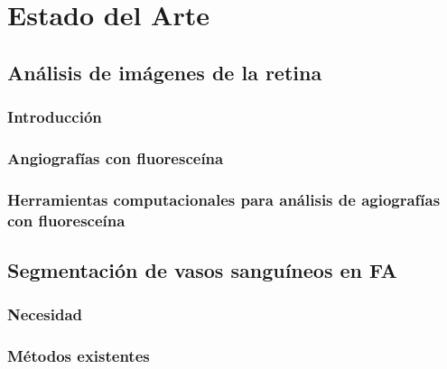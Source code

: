 
\chapter{Estado del Arte} %

\label{Chapter2} %


\section{An\'alisis  de im\'agenes de la retina}

	\subsection{Introducci\'on}

	\subsection{Angiograf\'ias con fluoresce\'ina}

	\subsection{Herramientas computacionales para an\'alisis de agiograf\'ias con fluoresce\'ina}

\section{Segmentaci\'on de vasos sangu\'ineos en FA}

	\subsection{Necesidad}

	\subsection{M\'etodos existentes}
